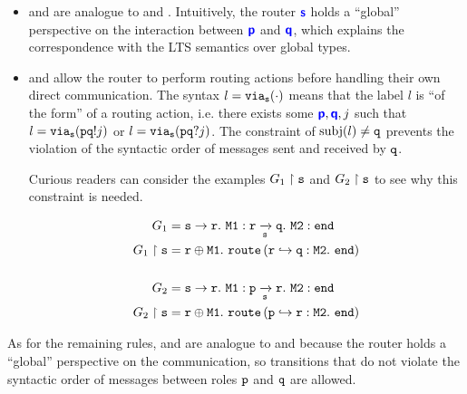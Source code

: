 \begin{itemize}

\item {} and  are
analogue to  and .
Intuitively, the router $\role{s}$ holds a
``global'' perspective on the interaction
between $\role{p}$ and $\role{q}$, which explains
the correspondence with the LTS semantics over global
types.

\item {} and  allow
the router to perform routing actions before handling
their own direct communication. The syntax $l = \via{s}{\cdot}$
means that the label $l$ is ``of the form'' of a routing
action, i.e. there exists some $\role{p}, \role{q}, j$
such that $l = \via{s}{\aout{p}{q}{j}}$ or 
$l = \via{s}{\ain{p}{q}{j}}$.
The constraint of $\subj{l} \neq \mrole{q}$
prevents the violation of the syntactic order of messages
sent and received by $\mrole{q}$.

Curious readers can consider the examples 
$\proj{G_1}{s}$ and $\proj{G_2}{s}$
to see why this constraint is needed.

\begin{align*}
G_1 &= \gcommone{s}{r}{\tmsg{M1}}: \grouteone{r}{q}{s}{\tmsg{M2}} \tend \\
\proj{G_1}{s} &= \tselone{r}{\tmsg{M1}}. ~ 
	\routerone{r}{q}{\tmsg{M2}}{\tend} \\~\\
G_2 &= \gcommone{s}{r}{\tmsg{M1}}: \grouteone{p}{r}{s}{\tmsg{M2}} \tend \\
\proj{G_2}{s} &= \tselone{r}{\tmsg{M1}}. ~ 
	\routerone{p}{r}{\tmsg{M2}}{\tend} \\
\end{align*}

\end{itemize}

As for the remaining rules,
 and  are analogue to
 and  because the router
holds a ``global'' perspective on the communication,
so transitions that do not violate the syntactic order
of messages between roles $\mrole{p}$ and $\mrole{q}$
are allowed.
